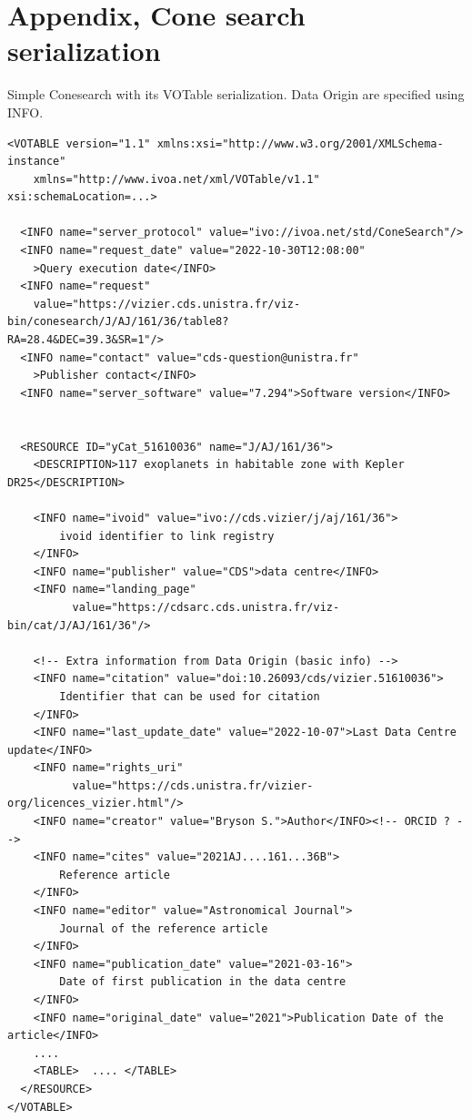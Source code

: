 \documentclass[11pt,a4paper]{ivoa}
\begin{document}
%



\appendix
\section{Appendix, Cone search serialization}\label{sec:appendixA}
Simple Conesearch with its VOTable serialization. Data Origin are specified using  INFO.
\begin{lstlisting}[basicstyle=\footnotesize\ttfamily]
<VOTABLE version="1.1" xmlns:xsi="http://www.w3.org/2001/XMLSchema-instance"
    xmlns="http://www.ivoa.net/xml/VOTable/v1.1" xsi:schemaLocation=...>

  <INFO name="server_protocol" value="ivo://ivoa.net/std/ConeSearch"/>
  <INFO name="request_date" value="2022-10-30T12:08:00"
    >Query execution date</INFO>
  <INFO name="request" 
    value="https://vizier.cds.unistra.fr/viz-bin/conesearch/J/AJ/161/36/table8?
RA=28.4&DEC=39.3&SR=1"/>
  <INFO name="contact" value="cds-question@unistra.fr"
    >Publisher contact</INFO>
  <INFO name="server_software" value="7.294">Software version</INFO>


  <RESOURCE ID="yCat_51610036" name="J/AJ/161/36">
    <DESCRIPTION>117 exoplanets in habitable zone with Kepler DR25</DESCRIPTION>

    <INFO name="ivoid" value="ivo://cds.vizier/j/aj/161/36">
        ivoid identifier to link registry
    </INFO>
    <INFO name="publisher" value="CDS">data centre</INFO>
    <INFO name="landing_page"
          value="https://cdsarc.cds.unistra.fr/viz-bin/cat/J/AJ/161/36"/>

    <!-- Extra information from Data Origin (basic info) -->
    <INFO name="citation" value="doi:10.26093/cds/vizier.51610036">
        Identifier that can be used for citation
    </INFO>
    <INFO name="last_update_date" value="2022-10-07">Last Data Centre update</INFO>
    <INFO name="rights_uri"
          value="https://cds.unistra.fr/vizier-org/licences_vizier.html"/>
    <INFO name="creator" value="Bryson S.">Author</INFO><!-- ORCID ? -->
    <INFO name="cites" value="2021AJ....161...36B">
        Reference article
    </INFO>
    <INFO name="editor" value="Astronomical Journal">
        Journal of the reference article
    </INFO>
    <INFO name="publication_date" value="2021-03-16">
        Date of first publication in the data centre
    </INFO>
    <INFO name="original_date" value="2021">Publication Date of the article</INFO>
    ....
    <TABLE>  .... </TABLE>
  </RESOURCE>
</VOTABLE>
\end{lstlisting}
\end{document}
